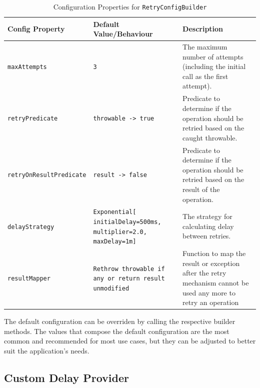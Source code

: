 \begin{table}[!htb]
    \centering
    \caption{Configuration Properties for \texttt{RetryConfigBuilder}}
    \label{tab:retry-config-builder}
    \vspace{0.3cm}
    \begin{tabular}{|l|p{5cm}|p{6cm}|}
        \hline
        \textbf{Config Property}        & \textbf{Default Value/Behaviour}                                       & \textbf{Description}                                                                            \\ \hline
        \texttt{maxAttempts}            & \texttt{3}                                                             & The maximum number of attempts (including the initial call as the first attempt).               \\ \hline
        \texttt{retryPredicate}         & \texttt{throwable -> true}                                             & Predicate to determine if the operation should be retried based on the caught throwable.        \\ \hline
        \texttt{retryOnResultPredicate} & \texttt{result -> false}                                               & Predicate to determine if the operation should be retried based on the result of the operation. \\ \hline
        \texttt{delayStrategy}          & \texttt{Exponential[ initialDelay=500ms, multiplier=2.0, maxDelay=1m]}          & The strategy for calculating delay between retries.                                             \\ \hline
        \texttt{resultMapper} & \texttt{Rethrow throwable
        if any or return result unmodified}          & Function
        to map the result or exception after the retry mechanism cannot be used any more to retry an operation                            \\ \hline
    \end{tabular}
\end{table}

The default configuration can be overriden by calling the respective builder methods.
The values that compose the default configuration are the most common and recommended for most use cases, but they can be adjusted to better suit the application's needs.

\subsection{Custom Delay Provider}\label{subsec:retry-custom-delay-provider}

